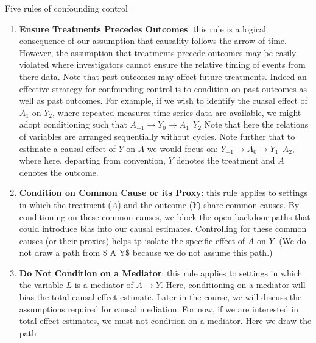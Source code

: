 \documentclass[
  single column]{article}
\begin{document}
\begin{table}

\caption{\label{tbl-terminologyconfounders}Five rules of confounding
control}

\centering{

\terminologyelconfounders

}

\end{table}%

\begin{enumerate}
\def\labelenumi{\arabic{enumi}.}
\item
  \textbf{Ensure Treatments Precedes Outcomes}: this rule is a logical
  consequence of our assumption that causality follows the arrow of
  time. However, the assumption that treatments precede outcomes may be
  easily violated where investigators cannot ensure the relative timing
  of events from there data. Note that past outcomes may affect future
  treatments. Indeed an effective strategy for confounding control is to
  condition on past outcomes as well as past outcomes. For example, if
  we wish to identify the cuasal effect of \(A_1\) on \(Y_2\), where
  repeated-measures time series data are available, we might adopt
  conditioning such that
  \(\boxed{A_{-1}} \to \boxed{Y_0} \to A_1 ~~ Y_2\) Note that here the
  relations of variables are arranged sequentially without cycles. Note
  further that to estimate a causal effect of \(Y\) on \(A\) we would
  focus on: \(\boxed{Y_{-1}} \to \boxed{A_0} \to Y_1 ~~ A_2\), where
  here, departing from convention, \(Y\) denotes the treatment and \(A\)
  denotes the outcome.
\item
  \textbf{Condition on Common Cause or its Proxy}: this rule applies to
  settings in which the treatment (\(A\)) and the outcome (\(Y\)) share
  common causes. By conditioning on these common causes, we block the
  open backdoor paths that could introduce bias into our causal
  estimates. Controlling for these common causes (or their proxies)
  helps tp isolate the specific effect of \(A\) on \(Y\). (We do not
  draw a path from \$ A \to Y\$ because we do not assume this path.)
\item
  \textbf{Do Not Condition on a Mediator}: this rule applies to settings
  in which the variable \(L\) is a mediator of \(A \to Y\). Here,
  conditioning on a mediator will bias the total causal effect estimate.
  Later in the course, we will discuss the assumptions required for
  causal mediation. For now, if we are interested in total effect
  estimates, we must not condition on a mediator. Here we draw the path

\end{enumerate}
\end{document}
